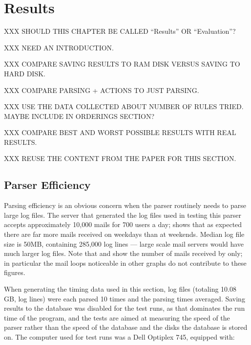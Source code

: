 \chapter{Results}

\label{Results}

XXX SHOULD THIS CHAPTER BE CALLED ``Results'' OR ``Evaluation''\@?

XXX NEED AN INTRODUCTION\@.

XXX COMPARE SAVING RESULTS TO RAM DISK VERSUS SAVING TO HARD DISK\@.

XXX COMPARE PARSING + ACTIONS TO JUST PARSING\@.

XXX USE THE DATA COLLECTED ABOUT NUMBER OF RULES TRIED\@.  MAYBE INCLUDE IN
ORDERINGS SECTION\@?

XXX COMPARE BEST AND WORST POSSIBLE RESULTS WITH REAL RESULTS\@.

XXX REUSE THE CONTENT FROM THE PAPER FOR THIS SECTION\@.

\section{Parser Efficiency}

\label{parser efficiency}

Parsing efficiency is an obvious concern when the parser routinely needs to
parse large log files.  The server that generated the log files used in
testing this parser accepts approximately 10,000 mails for 700 users a day;
 shows that as expected there are far more
mails received on weekdays than at weekends.   Median log file size is
50MB, containing 285,000 log lines --- large scale mail servers would have
much larger log files.  Note that  and
 show the number of
mails received by  only; in particular the mail loops
noticeable in other graphs do not contribute to these figures.



When generating the timing data used in this section, \numberOFlogFILES{}
log files (totaling 10.08 GB, \numberOFlogLINEShuman{} log lines) were each
parsed 10 times and the parsing times averaged.  Saving results to the
database was disabled for the test runs, as that dominates the run time of
the program, and the tests are aimed at measuring the speed of the parser
rather than the speed of the database and the disks the database is stored
on.  The computer used for test runs was a Dell Optiplex 745, equipped
with:


